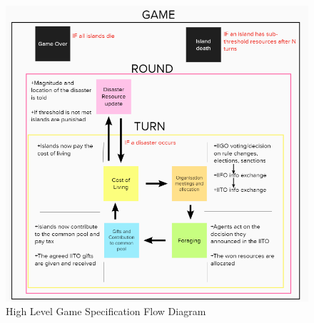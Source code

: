 \begin{figure}[!htb]
    \centering
    \includegraphics{images/gamespec-flow.png}
    \caption{High Level Game Specification Flow Diagram}
    \label{fig:gamedesign-flow}
\end{figure}
